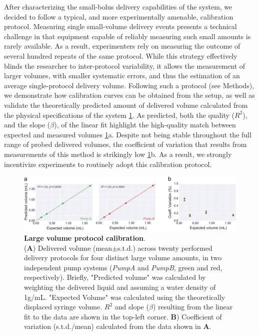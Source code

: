 After characterizing the small-bolus delivery capabilities of the system, we decided to follow a typical, and more experimentally amenable, calibration protocol. Measuring single small-volume delivery events presents a technical challenge in that equipment capable of reliably measuring such small amounts is rarely available. As a result, experimenters rely on measuring the outcome of several hundred repeats of the same protocol. While this strategy effectively blinds the researcher to inter-protocol variability, it allows the measurement of larger volumes, with smaller systematic errors, and thus the estimation of an average single-protocol delivery volume. Following such a protocol (see Methods), we demonstrate how calibration curves can be obtained from the setup, as well as validate the theoretically predicted amount of delivered volume calculated from the physical specifications of the system \ref{fig:LargeVolumeCalibration}. As predicted, both the quality  ($R^2$), and the slope ($\beta$), of the linear fit highlight the high-quality match between expected and measured volumes \ref{fig:LargeVolumeCalibration}a. Despite not being stable throughout the full range of probed delivered volumes, the coefficient of variation that results from measurements of this method is strikingly low \ref{fig:LargeVolumeCalibration}b. As a result, we strongly incentivize experiments to routinely adopt this calibration protocol.

\begin{figure}[ht] 
	\centering
	\includegraphics[width=1.0\linewidth]{Figures/Artboard 6.pdf}
	\caption{\textbf{Large volume protocol calibration}.\\
		(\textbf{A}) Delivered volume (mean$\pm$s.t.d.) across twenty performed delivery protocols for four distinct large volume amounts, in two independent pump systems (\textit{PumpA} and \textit{PumpB}, green and red, respectively). Briefly, "Predicted volume" was calculated by weighting the delivered liquid and assuming a water density of 1g/mL. "Expected Volume" was calculated using the theoretically displaced syringe volume.  $R^{2}$ and slope ($\beta$) resulting from the linear fit to the data are shown in the top-left corner. \textbf{B}) Coefficient of variation (s.t.d./mean) calculated from the data shown in \textbf{A}.}
	\label{fig:LargeVolumeCalibration} 
\end{figure}

